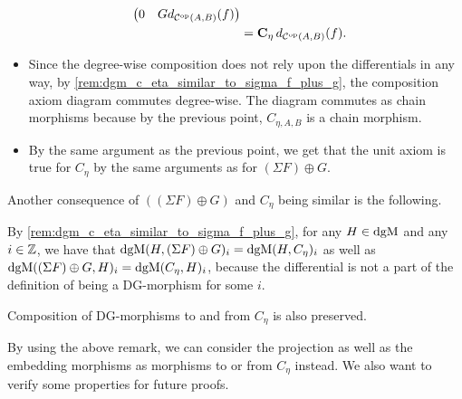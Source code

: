 \begin{remark}
\begin{itemize}
{\begin{align*}
\begin{pmatrix}
                    0 & G d_{{\mathcal{C}}^{\operatorname{op}}(A, B)}(f)
                \end{pmatrix} \\
                &= \operatorname{\mathbf{C}}_{\eta} d_{{\mathcal{C}}^{\operatorname{op}}(A, B)}(f).
            \end{align*}
        }
        \item {
            Since the degree-wise composition does not rely upon the differentials in any way, by \autoref{rem:dgm_c_eta_similar_to_sigma_f_plus_g},
            the composition axiom diagram commutes degree-wise. The diagram commutes as chain morphisms because by the previous point, \( C_{\eta, A, B} \) is a chain morphism.
        }
        \item {
            By the same argument as the previous point, we get that the unit axiom is true for \( C_{\eta} \) by the same arguments as for \( (\Sigma F) \oplus G \).
        }
    \end{itemize}
\end{remark}

Another consequence of \( ((\Sigma F) \oplus G) \) and \( C_{\eta} \) being similar is the following.

\begin{remark}
    \label{rem:dgm_different_dg_morphisms_same_space_give_degree-wise_same_morphisms}
    By \autoref{rem:dgm_c_eta_similar_to_sigma_f_plus_g}, for any \( H \in \operatorname{dgM} \) and any \( i \in {\mathbb{Z}} \), we have that \( \operatorname{dgM}(H, (\Sigma F) \oplus G)_i = \operatorname{dgM}(H, C_{\eta})_i \) as well as \( \operatorname{dgM}((\Sigma F) \oplus G, H)_i = \operatorname{dgM}(C_{\eta}, H)_i \), because the differential is not a part of the definition of being a DG-morphism for some \( i \).

    Composition of DG-morphisms to and from \( C_{\eta} \) is also preserved.
\end{remark}

By using the above remark, we can consider the projection as well as the embedding morphisms as morphisms to or from \( C_{\eta} \) instead. We also want to verify some properties for future proofs.

